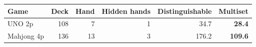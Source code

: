 \begin{tabular}{l r r r r r}
\toprule
Game & Deck & Hand & Hidden hands & Distinguishable & Multiset \\
\midrule
UNO 2p & 108 & 7 & 1 & 34.7 & \textbf{28.4} \\
Mahjong 4p & 136 & 13 & 3 & 176.2 & \textbf{109.6} \\
\bottomrule
\end{tabular}
